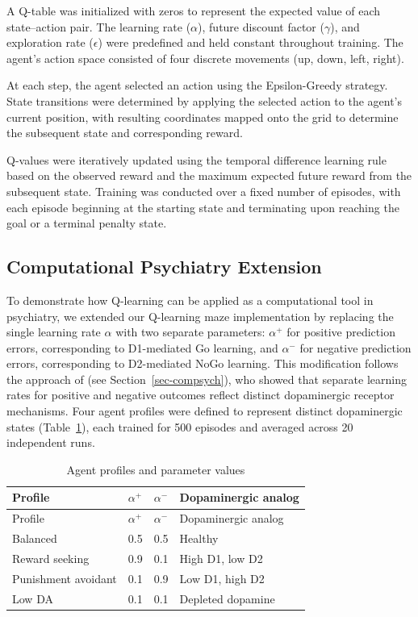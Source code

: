\documentclass[
  authoryear,
  preprint]{elsarticle}
\begin{document}
A Q-table was initialized with zeros to represent the expected value of
each state--action pair. The learning rate (\(\alpha\)), future discount
factor (\(\gamma\)), and exploration rate (\(\epsilon\)) were predefined
and held constant throughout training. The agent's action space
consisted of four discrete movements (up, down, left, right).

At each step, the agent selected an action using the Epsilon-Greedy
strategy. State transitions were determined by applying the selected
action to the agent's current position, with resulting coordinates
mapped onto the grid to determine the subsequent state and corresponding
reward.

Q-values were iteratively updated using the temporal difference learning
rule based on the observed reward and the maximum expected future reward
from the subsequent state. Training was conducted over a fixed number of
episodes, with each episode beginning at the starting state and
terminating upon reaching the goal or a terminal penalty state.

\subsection{Computational Psychiatry
Extension}\label{computational-psychiatry-extension}

To demonstrate how Q-learning can be applied as a computational tool in
psychiatry, we extended our Q-learning maze implementation by replacing
the single learning rate \(\alpha\) with two separate parameters:
\(\alpha^+\) for positive prediction errors, corresponding to
D1-mediated Go learning, and \(\alpha^-\) for negative prediction
errors, corresponding to D2-mediated NoGo learning. This modification
follows the approach of \citet{Frank2007} (see
Section~\ref{sec-compsych}), who showed that separate learning rates for
positive and negative outcomes reflect distinct dopaminergic receptor
mechanisms. Four agent profiles were defined to represent distinct
dopaminergic states (Table~\ref{tbl-agents}), each trained for 500
episodes and averaged across 20 independent runs.

\begin{longtable}[]{@{}llll@{}}
\caption{Agent profiles and parameter
values}\label{tbl-agents}\tabularnewline
\toprule\noalign{}
Profile & \(\alpha^+\) & \(\alpha^-\) & Dopaminergic analog \\
\midrule\noalign{}
\endfirsthead
\toprule\noalign{}
Profile & \(\alpha^+\) & \(\alpha^-\) & Dopaminergic analog \\
\midrule\noalign{}
\endhead
\bottomrule\noalign{}
\endlastfoot
Balanced & 0.5 & 0.5 & Healthy \\
Reward seeking & 0.9 & 0.1 & High D1, low D2 \\
Punishment avoidant & 0.1 & 0.9 & Low D1, high D2 \\
Low DA & 0.1 & 0.1 & Depleted dopamine \\
\end{longtable}
\end{document}
